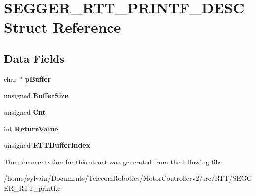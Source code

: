 \hypertarget{structSEGGER__RTT__PRINTF__DESC}{}\section{S\+E\+G\+G\+E\+R\+\_\+\+R\+T\+T\+\_\+\+P\+R\+I\+N\+T\+F\+\_\+\+D\+E\+SC Struct Reference}
\label{structSEGGER__RTT__PRINTF__DESC}
\subsection*{Data Fields}
\begin{DoxyCompactItemize}
\item 
\hypertarget{structSEGGER__RTT__PRINTF__DESC_ab8724b23ebf34566d69eb6ed4a0b374e}{}\label{structSEGGER__RTT__PRINTF__DESC_ab8724b23ebf34566d69eb6ed4a0b374e} 
char $\ast$ {\bfseries p\+Buffer}
\item 
\hypertarget{structSEGGER__RTT__PRINTF__DESC_a26ff82b7970c500bb29f098cf49dd065}{}\label{structSEGGER__RTT__PRINTF__DESC_a26ff82b7970c500bb29f098cf49dd065} 
unsigned {\bfseries Buffer\+Size}
\item 
\hypertarget{structSEGGER__RTT__PRINTF__DESC_a65faff93dba548785741e95b5bd4e5b7}{}\label{structSEGGER__RTT__PRINTF__DESC_a65faff93dba548785741e95b5bd4e5b7} 
unsigned {\bfseries Cnt}
\item 
\hypertarget{structSEGGER__RTT__PRINTF__DESC_a04a163688303b84088292b87423845ec}{}\label{structSEGGER__RTT__PRINTF__DESC_a04a163688303b84088292b87423845ec} 
int {\bfseries Return\+Value}
\item 
\hypertarget{structSEGGER__RTT__PRINTF__DESC_a843108780297879b7b99e4b31fc98463}{}\label{structSEGGER__RTT__PRINTF__DESC_a843108780297879b7b99e4b31fc98463} 
unsigned {\bfseries R\+T\+T\+Buffer\+Index}
\end{DoxyCompactItemize}


The documentation for this struct was generated from the following file\+:\begin{DoxyCompactItemize}
\item 
/home/sylvain/\+Documents/\+Telecom\+Robotics/\+Motor\+Controllerv2/src/\+R\+T\+T/S\+E\+G\+G\+E\+R\+\_\+\+R\+T\+T\+\_\+printf.\+c\end{DoxyCompactItemize}
